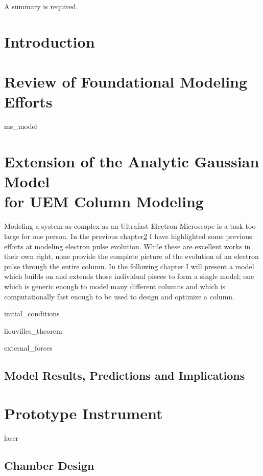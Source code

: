 \documentclass{uicthesi}
\begin{document}
\summary
A summary is required.

\chapter{Introduction}

\chapter{Review of Foundational Modeling Efforts} \label{chap:previous_models}

  {ms_model}

\chapter{Extension of the Analytic Gaussian Model\\for UEM Column Modeling}

Modeling a system as complex as an Ultrafast Electron Microscope is a task too large for one person.
In the previous chapter\ref{chap:previous_models} I have highlighted some previous efforts at modeling electron pulse evolution.
While these are excellent works in their own right, none provide the complete picture of the evolution of an electron pulse through the entire column.
In the following chapter I will present a model which builds on and extends those individual pieces to form a single model; one which is generic enough to model many different columns and which is computationally fast enough to be used to design and optimize a column.

  {initial_conditions}

  {liouvilles_theorem}

  {external_forces}

\section{Model Results, Predictions and Implications} \label{sec:model_results}

\chapter{Prototype Instrument}

  {laser}

\section{Chamber Design}
\end{document}
